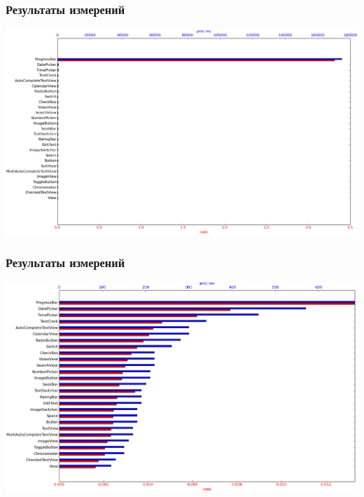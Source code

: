 \documentclass{beamer}
\begin{document}
    \begin{frame}
        \frametitle{Результаты измерений}
        \includegraphics[width=\linewidth]{result}
    \end{frame}
    \begin{frame}
        \frametitle{Результаты измерений}
        \includegraphics[width=\linewidth]{result_scaled}
    \end{frame}
\end{document}
